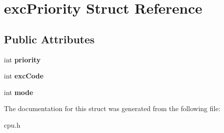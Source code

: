 \hypertarget{structexcPriority}{
\section{excPriority Struct Reference}
\label{structexcPriority}
}
\subsection*{Public Attributes}
\begin{DoxyCompactItemize}
\item 
\hypertarget{structexcPriority_a39a726a654eba6f653e0ade494218f40}{
int {\bfseries priority}}
\label{structexcPriority_a39a726a654eba6f653e0ade494218f40}

\item 
\hypertarget{structexcPriority_a056c56096bbf838f85991bd1b069072e}{
int {\bfseries excCode}}
\label{structexcPriority_a056c56096bbf838f85991bd1b069072e}

\item 
\hypertarget{structexcPriority_a3cf74f18cde52f3f849ae26897141de4}{
int {\bfseries mode}}
\label{structexcPriority_a3cf74f18cde52f3f849ae26897141de4}

\end{DoxyCompactItemize}


The documentation for this struct was generated from the following file:\begin{DoxyCompactItemize}
\item 
cpu.h\end{DoxyCompactItemize}
